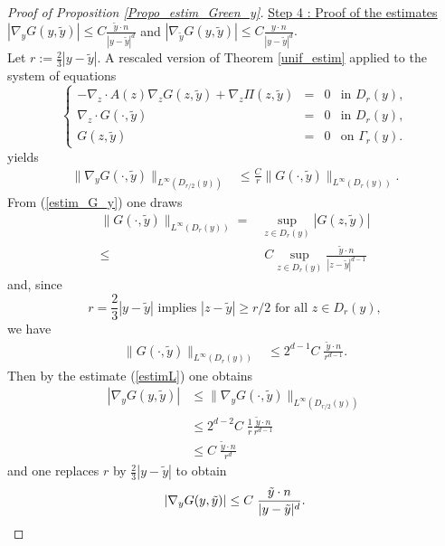 \documentclass[11pt, reqno]{amsart}
\theoremstyle{definition}
\theoremstyle{remark}
\numberwithin{equation}{section}
\begin{document}
\begin{appendices}
\begin{proof}[Proof of \textup{Proposition \ref{Propo_estim_Green_y}}]
		\noindent \underline{Step 4 : Proof of the estimates}  $| \nabla_y G(y,\tilde{y})| \leq C  \frac{\tilde{y}\cdot n}{|y-\tilde{y}|^{d}}$ and  $| \nabla_{\tilde{y}}G(y,\tilde{y})| \leq C  \frac{ y \cdot n}{|y-\tilde{y}|^{d}}.$\\
		Let  $r:=\frac{2}{3}|y-\tilde{y}|.$ 
		A rescaled version of Theorem \ref{unif_estim} applied to the system of equations 
		\begin{equation}\label{system_D_r}
			\left\{
			\begin{array}{rcll}
				-\nabla_z\cdot A (z)  \nabla_z G(z,\tilde{y}) +  \nabla_z \Pi(z,\tilde{y})&=& 0    &\mbox{in } D_r(y),\\
				\nabla_z\cdot G(\cdot,\tilde{y})&=& 0   &\mbox{in } D_r(y),\\
				G(z,\tilde{y}) &=& 0  & \mbox{on } \Gamma_r(y).
			\end{array}
			\right. 
		\end{equation}
		yields
		\begin{align}
			\|\nabla_y G(\cdot ,\tilde{y})\|_{L^{\infty}(D_{r/2}(y))} 
			&\leq \frac{C}{r} \|  G(\cdot ,\tilde{y})\|_{L^{\infty}(D_{r}(y))}.\label{estimL}
		\end{align}
		From (\ref{estim_G_y}) one draws
		\begin{align*}
			\|  G(\cdot ,\tilde{y})\|_{L^{\infty}(D_{r}(y))} =& \sup_{z\in{D_{r}(y)}} |G(z ,\tilde{y})|\nonumber \\
			\leq& \; C\sup_{z\in{D_{r}(y)}}  \frac{\tilde{y}\cdot n }{|z-\tilde{y}|^{d-1}}
		\end{align*}
		and, since $$r=\frac{2}{3}|y-\tilde{y}| \mbox{  implies  } |z-\tilde{y}| \geq r/2  \mbox{ for all } z \in{D_{r}(y)},$$ 
		we have
		\begin{align*}
			\|  G(\cdot ,\tilde{y})\|_{L^{\infty}(D_{r}(y))} 
			& \leq  2^{d-1} C  \;\frac{\tilde{y}\cdot n }{r^{d-1}}. \label{boundCrd2}
		\end{align*}
		Then by the estimate (\ref{estimL}) one obtains
		\begin{align*}
			|\nabla_y G(y,\tilde{y})|  &\leq\|\nabla_y G(\cdot ,\tilde{y})\|_{L^{\infty}(D_{r/2}(y))}\nonumber\\ 
			& \leq 2^{d-2} C \; \frac{1  }{r} \frac{\tilde{y}\cdot n  }{r^{d-1}}\nonumber\\
			& \leq C \; \frac{\tilde{y}\cdot n }{r^{d}} 
		\end{align*} 
		and one replaces $r$ by $\frac{2}{3}|y-\tilde{y}|$ to obtain
		\begin{equation}
			|\nabla_y G(y ,\tilde{y})|
			\leq C \; \frac{\tilde{y}\cdot n  }{|y-\tilde{y}|^{d}}.\\ 
		\end{equation}
		

\end{proof}
\end{appendices}
\end{document}
